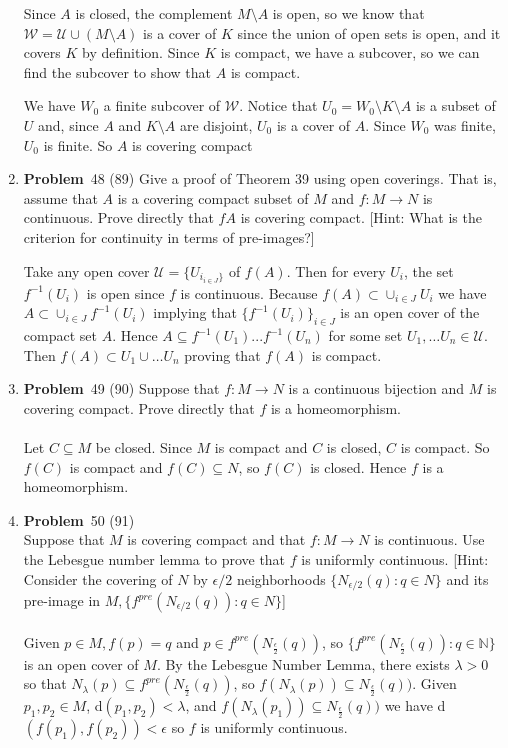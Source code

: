 \documentclass[12pt]{amsart}
\theoremstyle{definition}
\newcommand{\mbN}{\mathbb{N}}
\newcommand{\mcU}{\mathcal{U}}
\newcommand{\itep}{\item {\bfseries Problem}\ }
\begin{document}
\begin{enumerate}[series=p]
Since $A$ is closed, the complement $M \setminus A$ is open, so we know that $\mathcal{W} = \mcU \cup (M \setminus A)$ is a cover of $K$ since the union of open sets is open, and it covers $K$ by definition. Since $K$ is compact, we have a subcover, so we can find the subcover to show that $A$ is compact.

We have $W_0$ a finite subcover of $\mathcal{W}$. Notice that $U_0=W_0\setminus {K \setminus A}$ is a subset of $U$ and, since $A$ and $K \setminus A$ are disjoint, $U_0$ is a cover of $A$. Since $W_0$ was finite, $U_0$ is finite. So $A$ is covering compact
\newpage

\itep 48 (89)
Give a proof of Theorem 39 using open coverings.  That is, assume that $A$ is a covering compact subset of $M$ and $f: M \to N$ is continuous.  Prove directly that $fA$ is covering compact. [Hint: What is the criterion for continuity in terms of pre-images?]

Take any open cover $\mcU = \{U_{i_{i \in J}\}}$ of $f(A)$.  Then for every $U_i$, the set $f^{-1}(U_i)$ is open since $f$ is continuous.  Because $f(A) \subset \cup_{i \in J} U_i$ we have $A \subset \cup_{i \in J} f^{-1}(U_i)$ implying that $\{f^{-1}(U_i)\}_{i \in J}$ is an open cover of the compact set $A$.  Hence $A \subseteq f^{-1}(U_1)...f^{-1}(U_n)$ for some set $U_1, \dots U_n \in \mcU$.  Then $f(A) \subset U_1 \cup \dots U_n$ proving that $f(A)$ is compact. 
\newpage

\itep 49 (90)
Suppose that $f: M \to N$ is a continuous bijection and $M$ is covering compact.  Prove directly that $f$ is a homeomorphism.
\\
\\
Let $C \subseteq M$ be closed.  Since $M$ is compact and $C$ is closed, $C$ is compact.  So $f(C)$ is compact and $f(C) \subseteq N$, so $f(C)$ is closed.  Hence $f$ is a homeomorphism.
\newpage

\itep 50 (91)\\
Suppose that $M$ is covering compact and that $f:M \to N$ is continuous.  Use the Lebesgue number lemma to prove that $f$ is uniformly continuous.  [Hint: Consider the covering of $N$ by $\epsilon/2$ neighborhoods $\{N_{\epsilon/2}(q): q \in N\}$ and its pre-image in $M, \{f^{pre}(N_{\epsilon/2}(q)) :q \in N \}$]\\
\\
Given $p \in M, f(p) = q$ and $p \in f^{pre}(N_{\frac{\epsilon}{2}}(q))$, so $\{f^{pre}(N_{\frac{\epsilon}{2}}(q)) : q \in \mbN\}$ is an open cover of $M$.  By the Lebesgue Number Lemma, there exists $\lambda > 0$ so that $N_{\lambda}(p) \subseteq f^{pre}(N_{\frac{\epsilon}{2}}(q))$, so $f(N_{\lambda}(p)) \subseteq N_{\frac{\epsilon}{2}}(q))$.  Given $p_1, p_2 \in M$, d$(p_1, p_2) < \lambda$, and $f(N_{\lambda}(p_1)) \subseteq N_{\frac{\epsilon}{2}}(q))$ we have d$(f(p_1), f(p_2)) < \epsilon$ so $f$ is uniformly continuous.
\newpage


\end{enumerate}
\end{document}
